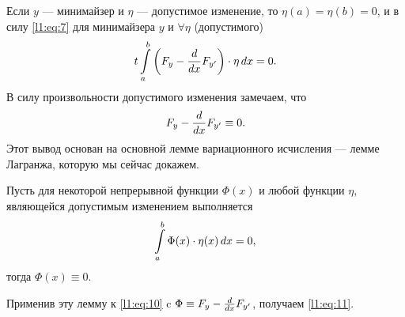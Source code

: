 Если $y$ --- минимайзер и $\eta$ --- допустимое изменение, то $\eta(a)=\eta(b)=0$, и в силу \eqref{l1:eq:7} для минимайзера $y$ и $\forall\eta$  (допустимого)
\begin{equation}
	\label{l1:eq:10}
	\hfill t\int\limits_a^b\left(F_y-\der{}{x}F_{y'}\right)\cdot\eta\,\dd{x}=0.\hfill
\end{equation}
В силу произвольности допустимого изменения замечаем, что 
\begin{equation}
	\label{l1:eq:11}
	\hfill F_y-\der{}{x}F_{y'}\equiv0.\hfill
\end{equation}
Этот вывод основан на основной лемме вариационного исчисления --- лемме Лагранжа, которую мы сейчас докажем.
\begin{_lemm}[Лагранжа]
	Пусть для некоторой непрерывной функции $\Phi(x)$ и любой функции $\eta$, являющейся допустимым изменением выполняется
	\begin{equation}
		\label{l1:eq:12}
		\hfill\int\limits_a^b \Phi(x)\cdot\eta(x)\,\dd{x}=0,\hfill
	\end{equation}
	тогда $\Phi(x)\equiv0$.
\end{_lemm}
\noindent Применив эту лемму к \eqref{l1:eq:10} c $\Phi\equiv F_y-\frac{d}{dx}F_{y'}$, получаем \eqref{l1:eq:11}.
